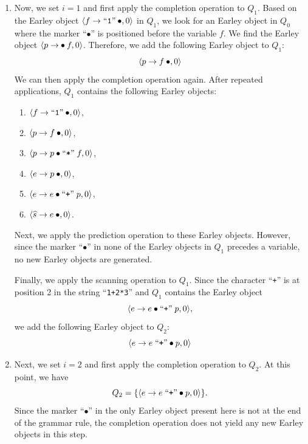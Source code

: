 \begin{enumerate}
      “1”, the set $Q_1$ takes the following form:   
      \[
        Q_1 = \bigl\{ \pair(f \rightarrow \squoted{1}\mdot, 0) \bigr\}
      \]
\item Now, we set $i = 1$ and first apply the completion operation to $Q_1$. Based on the Earley object
      $\pair(f \rightarrow \squoted{1}\mdot, 0)$ in $Q_1$, we look for an Earley object in $Q_0$ where the marker
      “$\bullet$” is positioned before the variable $f$. We find the Earley object
       $\pair(p \rightarrow \mdot f, 0)$. Therefore, we add the following Earley object to $Q_1$:   
       \[
         \pair(p \rightarrow f\mdot, 0)
       \]  
       We can then apply the completion operation again. After repeated applications, $Q_1$ contains the
       following Earley objects:
       \begin{enumerate}
       \item $\pair(f \rightarrow \squoted{1}\mdot, 0)$,
       \item $\pair(p \rightarrow f\mdot, 0)$,
       \item $\pair(p \rightarrow p \mdot \squoted{*}\; f, 0)$, 
       \item $\pair(e \rightarrow p\mdot, 0)$,
       \item $\pair(e \rightarrow e \mdot \squoted{+}\; p, 0)$,
       \item $\pair(\widehat{s} \rightarrow e\mdot, 0)$.
       \end{enumerate}  
       Next, we apply the prediction operation to these Earley objects. However, since the marker “$\bullet$” in
       none of the Earley objects in $Q_1$ precedes a variable, no new Earley objects are generated.   

       Finally, we apply the scanning operation to $Q_1$. Since the character “\texttt{+}” is at position 2 in
       the string “\texttt{1+2*3}” and $Q_1$ contains the Earley object   
       \[
         \pair(e \rightarrow e \mdot \squoted{+}\; p, 0),
       \]  
       we add the following Earley object to $Q_2$:  
       \[
         \pair(e \rightarrow e \;\squoted{+} \mdot p, 0)
       \]  
\item Next, we set $i = 2$ and first apply the completion operation to $Q_2$. At this point, we have  
      \[
        Q_2 = \{ \pair(e \rightarrow e \;\squoted{+} \mdot p, 0) \}.
      \]  
      Since the marker “$\bullet$” in the only Earley object present here is not at the end of the grammar rule,
      the completion operation does not yield any new Earley objects in this step.   


\end{enumerate}

